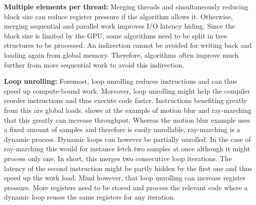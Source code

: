 \documentclass[m,times]{cgMA}
\begin{document}
\textbf{Multiple elements per thread:} Merging threads and simultaneously reducing block size can reduce register pressure if the algorithm allows it. Otherwise, merging sequential and parallel work improves I/O latency hiding. Since the block size is limited by the GPU, some algorithms need to be split in tree structures to be processed. An indirection cannot be avoided for writing back and loading again from global memory. Therefore, algorithms often improve much further from more sequential work to avoid this indirection.

\textbf{Loop unrolling:} Foremost, loop unrolling reduces instructions and can thus speed up compute-bound work. Moreover, loop unrolling might help the compiler reorder instructions and thus execute code faster. Instructions benefiting greatly from this are global loads. \cite{NVIDIA:PEAK_PERFORMANCE} shows at the example of motion blur and ray-marching that this greatly can increase throughput. Whereas the motion blur example uses a fixed amount of samples and therefore is easily unrollable, ray-marching is a dynamic process. Dynamic loops can however be partially unrolled. In the case of ray-marching this would for instance fetch two samples at once although it might process only one. In short, this merges two consecutive loop iterations. The latency of the second instruction might be partly hidden by the first one and thus speed up the work load. Mind however, that loop unrolling can increase register pressure. More registers need to be stored and process the relevant code where a dynamic loop reuses the same registers for any iteration.

\begin{flushright}\cite{AMD:GPU_OPEN}\cite{NVIDIA:BEST:PRACTICE}\cite{NVIDIA:PEAK_PERFORMANCE}\end{flushright}
\end{document}

